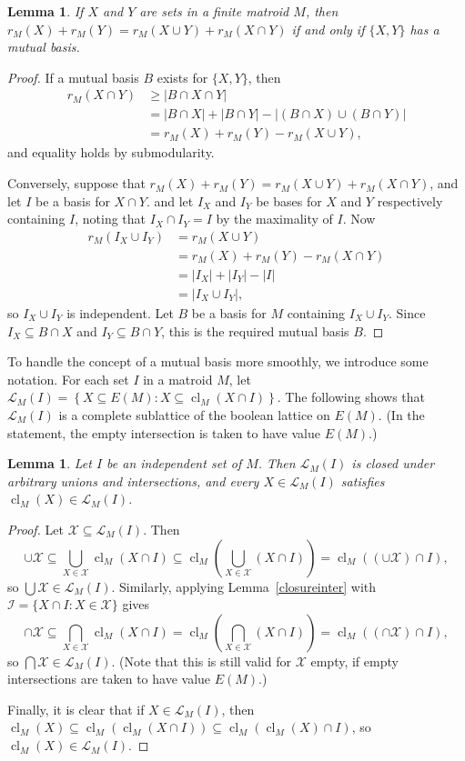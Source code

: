 \documentclass{amsart}
\theoremstyle{plain}
\newtheorem{lemma}[theorem]{Lemma}
\theoremstyle{definition}
\newcommand{\cL}{\mathcal{L}}
\newcommand{\cI}{\mathcal{I}}
\newcommand{\cX}{\mathcal{X}}
\DeclareMathOperator{\cl}{cl}
\newcommand{\set}[1]{\left\{#1\right\}}
\newcommand{\br}[1]{\left(#1\right)}
\renewcommand{\ge}{\geqslant}
\renewcommand{\ss}{\subseteq}
\begin{document}
\begin{lemma}\label{modpairiffbasis}
  If $X$ and $Y$ are sets in a finite matroid $M$, then $r_M(X) + r_M(Y) = r_M(X \cup Y) + r_M(X \cap Y)$
  if and only if $\{X,Y\}$ has a mutual basis. 
\end{lemma}
\begin{proof}
  If a mutual basis $B$ exists for $\{X,Y\}$, then
  \begin{align*}
    r_M(X \cap Y) &\ge |B \cap X \cap Y| \\ 
    &=  |B \cap X| + |B \cap Y| - |(B \cap X) \cup (B \cap Y)| \\ 
    &= r_M(X) + r_M(Y) - r_M(X \cup Y),
  \end{align*}
  and equality holds by submodularity. 

  Conversely, suppose that $r_M(X) + r_M(Y) = r_M(X \cup Y) + r_M(X \cap Y)$, and let $I$ be a basis for $X \cap Y$. 
  and let $I_X$ and $I_Y$ be bases for $X$ and $Y$ respectively containing $I$, noting that $I_X \cap I_Y = I$
  by the maximality of $I$. Now 
  \begin{align*}
    r_M(I_X \cup I_Y) &= r_M(X \cup Y) \\ 
    &= r_M(X) + r_M(Y) - r_M(X \cap Y) \\
    &= |I_X| + |I_Y| - |I| \\ 
    &= |I_X \cup I_Y|,
  \end{align*}
  so $I_X \cup I_Y$ is independent. Let $B$ be a basis for $M$ containing $I_X \cup I_Y$. 
  Since $I_X \ss B \cap X$ and $I_Y \ss B \cap Y$, this is the required mutual basis $B$. 
\end{proof}




To handle the concept of a mutual basis more smoothly, we introduce some notation.  
For each set $I$ in a matroid $M$, let $\cL_M(I) = \set{X \ss E(M) : X \ss \cl_M(X \cap I)}$. 
The following shows that $\cL_M(I)$ is a complete sublattice of the boolean lattice on $E(M)$.
(In the statement, the empty intersection is taken to have value $E(M)$.)

\begin{lemma}\label{blattice}
  Let $I$ be an independent set of $M$. Then $\cL_M(I)$ is closed under arbitrary unions and intersections, 
  and every $X \in \cL_M(I)$ satisfies $\cl_M(X) \in \cL_M(I)$. 
\end{lemma}
\begin{proof}
  Let $\cX \ss \cL_M(I)$. Then 
  \[ \cup \cX \ss \bigcup_{X \in \cX} \cl_M(X \cap I) \ss \cl_M\br{\bigcup_{X \in \cX} (X \cap I)} = \cl_M\br{\br{\cup\cX} \cap I },\]
  so $\bigcup \cX \in \cL_M(I)$. 
  Similarly, applying Lemma~\ref{closureinter} with $\cI = \{X \cap I : X \in \cX\}$ gives
  \[ \cap \cX \ss \bigcap_{X \in \cX} \cl_M(X \cap I) = \cl_M\br{\bigcap_{X \in \cX} (X \cap I)} = \cl_M\br{(\cap \cX) \cap I},\]
  so $\bigcap \cX \in \cL_M(I)$. (Note that this is still valid for $\cX$ empty, if empty intersections are taken to have value $E(M)$.)

  Finally, it is clear that if $X \in \cL_M(I)$, then $\cl_M(X) \ss \cl_M(\cl_M(X \cap I)) \ss \cl_M(\cl_M(X) \cap I)$, 
  so $\cl_M(X) \in \cL_M(I)$. 
\end{proof}
\end{document}
